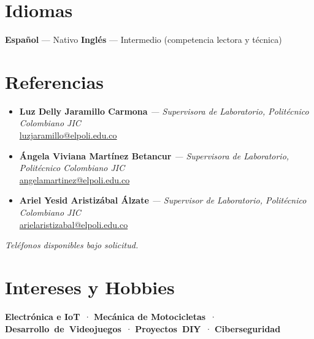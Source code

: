 \documentclass[11pt, a4paper]{article}
\begin{document}
\section{Idiomas}

\noindent\textbf{Español} — Nativo \hfill \textbf{Inglés} — Intermedio (competencia lectora y técnica)

\section{Referencias}

\begin{itemize}[leftmargin=0pt, label={}, itemsep=6pt]
  \item \textbf{Luz Delly Jaramillo Carmona} \textit{— Supervisora de Laboratorio, Politécnico Colombiano JIC}\\
        \href{mailto:luzjaramillo@elpoli.edu.co}{luzjaramillo@elpoli.edu.co}
  \item \textbf{Ángela Viviana Martínez Betancur} \textit{— Supervisora de Laboratorio, Politécnico Colombiano JIC}\\
        \href{mailto:angelamartinez@elpoli.edu.co}{angelamartinez@elpoli.edu.co}
  \item \textbf{Ariel Yesid Aristizábal Álzate} \textit{— Supervisor de Laboratorio, Politécnico Colombiano JIC}\\
        \href{mailto:arielaristizabal@elpoli.edu.co}{arielaristizabal@elpoli.edu.co}
\end{itemize}
\small\textit{Teléfonos disponibles bajo solicitud.}\normalsize

\section{Intereses y Hobbies}

\noindent
\textbf{Electrónica e IoT}~· \textbf{Mecánica de Motocicletas}~· \mbox{\textbf{Desarrollo de Videojuegos}}~· \mbox{\textbf{Proyectos DIY}}~· \textbf{Ciberseguridad}
\end{document}
